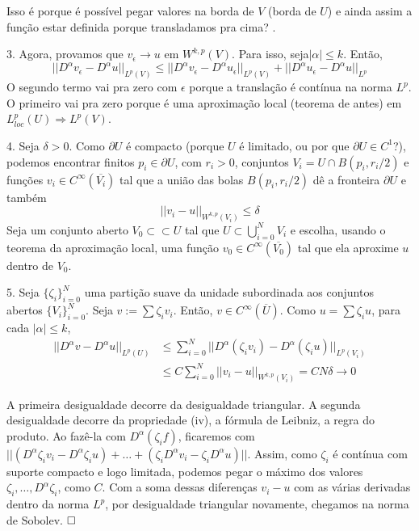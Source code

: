 \documentclass[a4paper, 11pt]{article}
\newcommand{\qed}{$\hfill\square$}
\newcommand{\pu}{\partial U}
\newcommand{\e}{\epsilon}
\begin{document}
 Isso é porque é possível pegar valores na borda de \( V \) (borda de \( U \)) e ainda assim a função estar definida porque transladamos pra cima? .

3. Agora, provamos que \( v_\e \rightarrow u \) em \( W^{k,p}(V) \). Para isso, seja\( |\alpha| \leq k \). Então, \[ ||D^\alpha v_\e - D^\alpha u||_{L^p(V)} \leq ||D^\alpha v_\e - D^\alpha u_\e||_{L^p(V)} + ||D^\alpha u_\e - D^\alpha u||_{L^p} \] O segundo termo vai pra zero com \( \e \) porque a translação é contínua na norma \( L^p \). O primeiro vai pra zero porque é uma aproximação local (teorema de antes) em \( L^p_{loc}(U) \Rightarrow L^p(V)  \).

4. Seja \( \delta >0 \). Como \( \pu \) é compacto (porque \( U \) é limitado, ou por que \( \pu \in C^1 \)?), podemos encontrar finitos \( p_i \in \pu \), com \( r_i>0 \), conjuntos \( V_i = U \cap B(p_i, r_i/2) \) e funções \( v_i \in C^\infty(\overline{V_i}) \) tal que a união das bolas \( B(p_i, r_i/2) \) dê a fronteira \( \pu \) e também \[ ||v_i - u||_{W^{k,p}(V_i)}\leq \delta \] Seja um conjunto aberto \( V_0 \subset\subset U \) tal que \( U \subset \bigcup_{i=0}^N V_i \) e escolha, usando o teorema da aproximação local, uma função \( v_0 \in C^\infty (\overline{V_0}) \) tal que ela aproxime \( u \) dentro de \( V_0 \).

5. Seja \( \{ \zeta_i \}_{i=0}^N \) uma partição suave da unidade subordinada aos conjuntos abertos \( \{V_i\}_{i=0}^N \). Seja \( v:= \sum \zeta_i v_i \). Então, \( v \in C^\infty (\overline{U}) \). Como \( u = \sum \zeta_i u \), para cada \( |\alpha|\leq k \), \begin{align*}
	||D^\alpha v - D^\alpha u||_{L^p(U)} &\leq \sum_{i=0}^{N} || D^\alpha (\zeta_i v_i) - D^\alpha (\zeta_i u)||_{L^p(V_i)}\\
	&\leq C \sum_{i=0}^N ||v_i - u||_{W^{k,p}(V_i)} = CN\delta \rightarrow 0
\end{align*}

A primeira desigualdade decorre da desigualdade triangular. A segunda desigualdade decorre da propriedade (iv), a fórmula de Leibniz, a regra do produto. Ao fazê-la com $D^\alpha(\zeta_i f)$, ficaremos com $||(D^\alpha\zeta_i v_i - D^\alpha\zeta_i u) + \ldots + (\zeta_i D^\alpha v_i - \zeta_i D^\alpha u) ||$. Assim, como $\zeta_i$ é contínua com suporte compacto e logo limitada, podemos pegar o máximo dos valores $\zeta_i, \ldots, D^\alpha\zeta_i$, como $C$. Com a soma dessas diferenças $v_i - u$ com as várias derivadas dentro da norma $L^p$, por desigualdade triangular novamente, chegamos na norma de Sobolev. \qed
\end{document}
